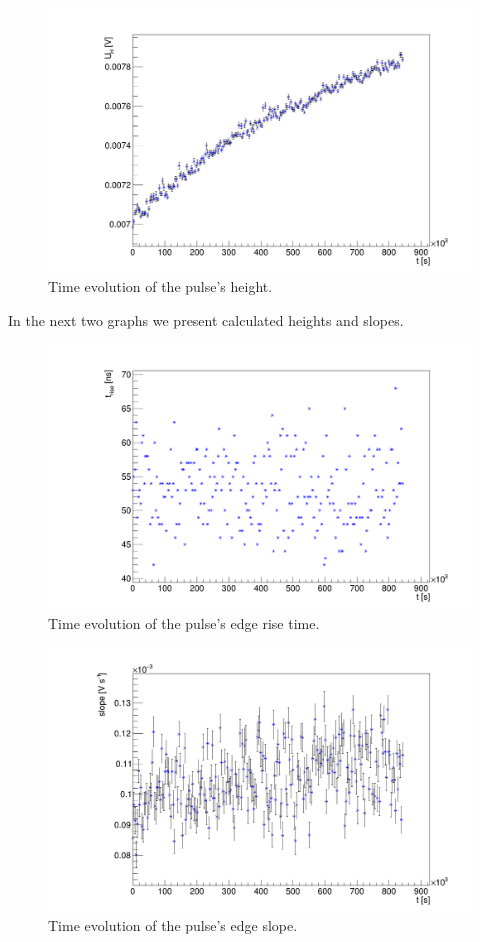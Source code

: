 \begin{figure}[H]
 \centering
 \includegraphics[scale=0.3]{./pictures/Height}
 \caption{Time evolution of the pulse's height.}
 \label{height1}
\end{figure}

In the next two graphs we present calculated heights and slopes.

\begin{figure}[H]
 \centering
 \includegraphics[scale=0.3]{./pictures/rise}
 \caption{Time evolution of the pulse's edge rise time.}
 \label{rise1}
\end{figure}

\begin{figure}[H]
 \centering
 \includegraphics[scale=0.3]{./pictures/Slope}
 \caption{Time evolution of the pulse's edge slope.}
 \label{slope1}
\end{figure}

